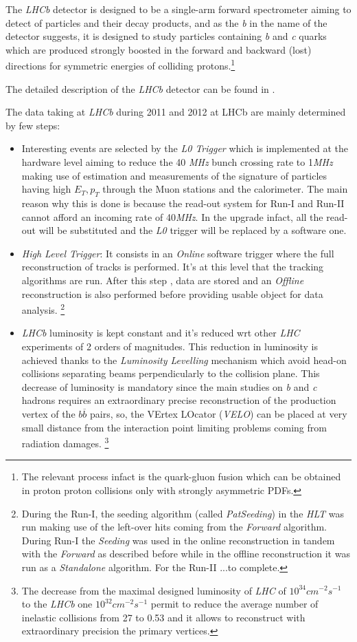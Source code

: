 \documentclass[paper=a4, fontsize=10pt]{scrartcl}
\numberwithin{equation}{section}		%
\numberwithin{figure}{section}			%
\numberwithin{table}{section}				%
\begin{document}
The \textit{LHCb} detector is designed to be a single-arm forward spectrometer aiming to detect of particles and their decay products, and as the \textit{b} in the name of the detector suggests, it is designed to study particles containing \textit{b} and \textit{c} quarks which are produced strongly boosted in the forward and backward (lost)  directions for symmetric energies of colliding protons.\footnote{The relevant process infact is the quark-gluon fusion which can be obtained in proton proton collisions only with strongly asymmetric PDFs.}

The detailed description of the \textit{LHCb} detector can be found in \cite{Blake1}.

The data taking at \textit{LHCb} during 2011 and 2012 at LHCb are mainly determined by few steps:
\begin{itemize}
\item{Interesting events are selected by the \textit{L0 Trigger} which is implemented at the hardware level aiming to reduce the 40 \textit{MHz} bunch crossing rate to 1\textit{MHz} making use of estimation and measurements of the signature of particles having high $E_{T},p_{T}$ through the Muon stations and the calorimeter. The main reason why this is done is because the read-out system for Run-I and Run-II cannot afford an incoming rate of 40\textit{MHz}. In the upgrade infact, all the read-out will be substituted and the \textit{L0} trigger will be replaced by a software one.}
\item{\textit{High Level Trigger}: It consists in an \textit{Online} software trigger where the full reconstruction of tracks is performed. It's at this level that the tracking algorithms are run. After this step , data are stored and an \textit{Offline} reconstruction is also performed before providing usable object for data analysis. \footnote{During the Run-I, the seeding algorithm (called \textit{PatSeeding}) in the \textit{HLT} was run making use of the left-over hits coming from the \textit{Forward} algorithm. During Run-I the \textit{Seeding} was used in the online reconstruction in tandem with the \textit{Forward} as described before while in the offline reconstruction it was run as a \textit{Standalone} algorithm. For the Run-II ...to complete.}}
\item{\textit{LHCb} luminosity is kept constant and it's reduced wrt other \textit{LHC} experiments of 2 orders of magnitudes. This reduction in luminosity is achieved thanks to the \textit{Luminosity Levelling} mechanism which avoid head-on collisions separating beams perpendicularly to the collision plane. This decrease of luminosity is mandatory since the main studies on \textit{b} and \textit{c} hadrons requires an extraordinary precise reconstruction of the production vertex of the $b\overline{b}$ pairs, so, the VErtex LOcator (\textit{VELO}) can be placed at very small distance from the interaction point limiting problems coming from radiation damages. \footnote{The decrease from the maximal designed luminosity of \textit{LHC} of $10^{34}cm^{-2}s^{-1}$ to the \textit{LHCb} one  $10^{32}cm^{-2}s^{-1}$ permit to reduce the average number of inelastic collisions from 27 to 0.53 and it allows to reconstruct with extraordinary precision the primary vertices.} }

\end{itemize}
\end{document}
